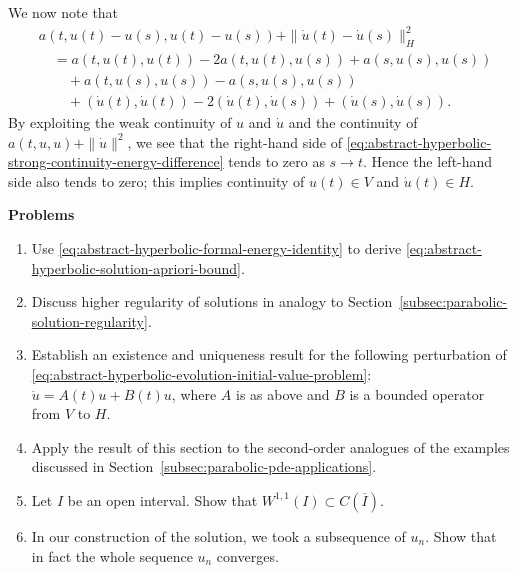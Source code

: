 We now note that
\begin{equation}\label{eq:abstract-hyperbolic-strong-continuity-energy-difference}
\begin{aligned}
&a(t,u(t)-u(s),u(t)-u(s))+\|\dot u(t)-\dot u(s)\|_H^2\\
&\quad=a(t,u(t),u(t))-2a(t,u(t),u(s))+a(s,u(s),u(s))\\
&\qquad+a(t,u(s),u(s))-a(s,u(s),u(s))\\
&\qquad+(\dot u(t),\dot u(t))-2(\dot u(t),\dot u(s))+(\dot u(s),\dot u(s)).
\end{aligned}
\end{equation}
By exploiting the weak continuity of $u$ and $\dot u$ and the continuity of $a(t,u,u)+\|\dot u\|^2$, we see that the right-hand side of \eqref{eq:abstract-hyperbolic-strong-continuity-energy-difference} tends to zero as $s\to t$. Hence the left-hand side also tends to zero; this implies continuity of $u(t)\in V$ and $\dot u(t)\in H$.

\textbf{Problems}

\begin{enumerate}[label=\thesection.\arabic*.,ref=\thesection.\arabic*,start=6,series=book-problems]

\item\label{ex:hyperbolic-energy-apriori-estimate} Use \eqref{eq:abstract-hyperbolic-formal-energy-identity} to derive \eqref{eq:abstract-hyperbolic-solution-apriori-bound}.

\item\label{ex:hyperbolic-higher-regularity-discussion} Discuss higher regularity of solutions in analogy to Section~\ref{subsec:parabolic-solution-regularity}.

\item\label{ex:hyperbolic-bounded-lower-order-perturbation} Establish an existence and uniqueness result for the following perturbation of \eqref{eq:abstract-hyperbolic-evolution-initial-value-problem}: $\ddot u=A(t)u+B(t)u$, where $A$ is as above and $B$ is a bounded operator from $V$ to $H$.

\item\label{ex:hyperbolic-second-order-pde-applications} Apply the result of this section to the second-order analogues of the examples discussed in Section~\ref{subsec:parabolic-pde-applications}.

\item\label{ex:wone-one-continuous-closed-interval} Let $I$ be an open interval. Show that $W^{1,1}(I)\subset C(\overline I)$.

\item\label{ex:hyperbolic-entire-galerkin-sequence-convergence} In our construction of the solution, we took a subsequence of $u_n$. Show that in fact the whole sequence $u_n$ converges.

\end{enumerate}
